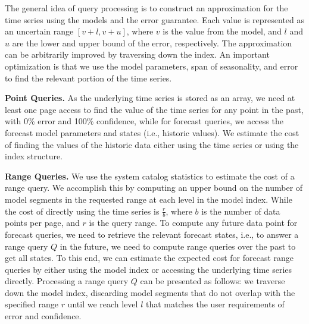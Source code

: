 \documentclass{sigmod}
\begin{document}
The general idea of query processing is to construct an approximation for the time series using the models and the error guarantee. Each value is represented as an 
uncertain range $[v+l,v+u]$, where $v$ is the value from the model, and $l$ and $u$ are the lower and upper bound of the error, respectively.
The approximation can be arbitrarily improved by traversing down the index. An important optimization is that we use the model parameters, span of seasonality, and error to find the relevant portion of the time series. %

{\bf Point Queries.}
As the underlying time series is stored as an array, we need at least one page access to find the value of the time series for any point in the past, with 0\% error and 100\% confidence,  
while for forecast queries, we access the forecast model parameters and states (i.e., historic values). We estimate the cost of finding the values of the historic data either using the time series or using the index structure.
 
 {\bf Range Queries.}
 We use the system catalog statistics to estimate the cost of a range query. We accomplish this by computing an upper bound on the number of model segments in the requested range 
at each level in the model index. While the cost of directly using the time series is  $\frac{r}{b}$, where $b$ is the number of data points per page, and $r$ is the query range.
To compute any future data point for forecast queries,  we need to retrieve the relevant forecast states, i.e., to answer a range query $Q$ in the future, we need to compute range queries over the past to get all states. To this end, we can estimate the expected cost for forecast range queries by either  using the model index  or accessing the underlying time series directly. 
Processing a  range query $Q$ can be presented as follows: we traverse down the  model index, discarding  model segments that do not overlap with the specified range $r$ until we reach level $l$ that matches the user requirements of error and confidence.
\end{document}
